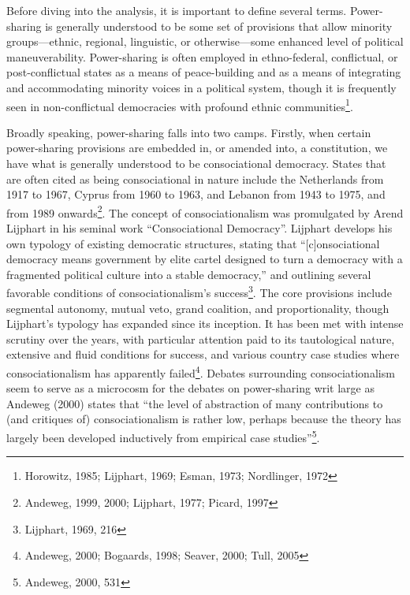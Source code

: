 \documentclass[12pt]{article}
\begin{document}
Before diving into the analysis, it is important to define several terms. Power-sharing is generally understood to be some set of provisions that allow minority groups---ethnic, regional, linguistic, or otherwise---some enhanced level of political maneuverability. Power-sharing is often employed in ethno-federal, conflictual, or post-conflictual states as a means of peace-building and as a means of integrating and accommodating minority voices in a political system, though it is frequently seen in non-conflictual democracies with profound ethnic communities\footnote{Horowitz, 1985; Lijphart, 1969; Esman, 1973; Nordlinger, 1972}.

Broadly speaking, power-sharing falls into two camps. Firstly, when certain power-sharing provisions are embedded in, or amended into, a constitution, we have what is generally understood to be consociational democracy. States that are often cited as being consociational in nature include the Netherlands from 1917 to 1967, Cyprus from 1960 to 1963, and Lebanon from 1943 to 1975, and from 1989 onwards\footnote{Andeweg, 1999, 2000; Lijphart, 1977; Picard, 1997}. The concept of consociationalism was promulgated by Arend Lijphart in his seminal work “Consociational Democracy”. Lijphart develops his own typology of existing democratic structures, stating that “[c]onsociational democracy means government by elite cartel designed to turn a democracy with a fragmented political culture into a stable democracy,” and outlining several favorable conditions of consociationalism’s success\footnote{Lijphart, 1969, 216}. The core provisions include segmental autonomy, mutual veto, grand coalition, and proportionality, though Lijphart's typology has expanded since its inception. It has been met with intense scrutiny over the years, with particular attention paid to its tautological nature, extensive and fluid conditions for success, and various country case studies where consociationalism has apparently failed\footnote{Andeweg, 2000; Bogaards, 1998; Seaver, 2000; Tull, 2005}. Debates surrounding consociationalism seem to serve as a microcosm for the debates on power-sharing writ large as Andeweg (2000) states that “the level of abstraction of many contributions to (and critiques of) consociationalism is rather low, perhaps because the theory has largely been developed inductively from empirical case studies”\footnote{Andeweg, 2000, 531}.
\end{document}
